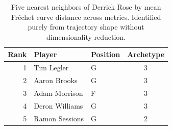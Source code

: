 \begin{table}[htbp]
  \centering\small
  \begin{tabular}{rllc}
    \toprule
    Rank & Player & Position & Archetype \\
    \midrule
    1 & Tim Legler & G & 3 \\
    2 & Aaron Brooks & G & 3 \\
    3 & Adam Morrison & F & 3 \\
    4 & Deron Williams & G & 3 \\
    5 & Ramon Sessions & G & 2 \\
    \bottomrule
  \end{tabular}
  \caption{Five nearest neighbors of Derrick Rose by mean Fr\'{e}chet curve distance across metrics. Identified purely from trajectory shape without dimensionality reduction.}
  \label{tab:Derrick_Rose_frechet_curve_neighbors}
\end{table}

